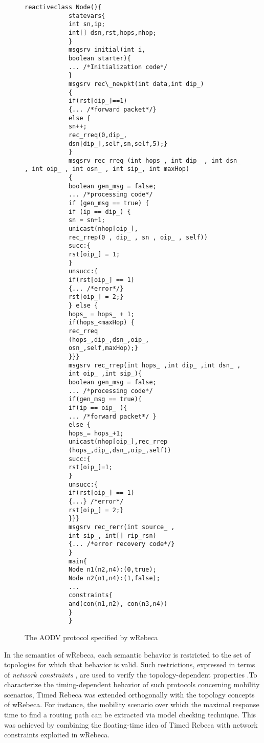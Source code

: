 \documentclass[conference]{IEEEtran}
\begin{document}
	\begin{figure*}
		\begin{center}
			\begin{lstlisting}[language=rebeca,multicols=2]
			reactiveclass Node(){
			statevars{
			int sn,ip;
			int[] dsn,rst,hops,nhop;
			}
			msgsrv initial(int i, 
			boolean starter){ 
			... /*Initialization code*/
			}			
			msgsrv rec\_newpkt(int data,int dip_)
			{
			if(rst[dip_]==1) 
			{... /*forward packet*/}
			else {                       
			sn++;
			rec_rreq(0,dip_,
			dsn[dip_],self,sn,self,5);}
			}   		
			msgsrv rec_rreq (int hops_, int dip_ , int dsn_ , int oip_ , int osn_ , int sip_, int maxHop) 
			{    
			boolean gen_msg = false;
			... /*processing code*/
			if (gen_msg == true) {
			if (ip == dip_) {
			sn = sn+1;
			unicast(nhop[oip_],
			rec_rrep(0 , dip_ , sn , oip_ , self))
			succ:{
			rst[oip_] = 1;
			}
			unsucc:{
			if(rst[oip_] == 1) 
			{... /*error*/}
			rst[oip_] = 2;}
			} else {
			hops_ = hops_ + 1;
			if(hops_<maxHop) {
			rec_rreq
			(hops_,dip_,dsn_,oip_,
			osn_,self,maxHop);} 
			}}}  		
			msgsrv rec_rrep(int hops_ ,int dip_ ,int dsn_ ,
			int oip_ ,int sip_){      
			boolean gen_msg = false;
			... /*processing code*/
			if(gen_msg == true){
			if(ip == oip_ ){
			... /*forward packet*/ }
			else {
			hops_= hops_+1;
			unicast(nhop[oip_],rec_rrep
			(hops_,dip_,dsn_,oip_,self))
			succ:{
			rst[oip_]=1;
			}
			unsucc:{
			if(rst[oip_] == 1) 
			{...} /*error*/
			rst[oip_] = 2;}
			}}}
			msgsrv rec_rerr(int source_ ,
			int sip_, int[] rip_rsn) 
			{... /*error recovery code*/}
			}
			main{
			Node n1(n2,n4):(0,true);
			Node n2(n1,n4):(1,false);
			...
			constraints{
			and(con(n1,n2), con(n3,n4)) 
			}  
			}
			\end{lstlisting}
		\end{center}
		\caption{The AODV protocol specified by wRebeca \label{code:aodv}\cite{AODVFatemeh}}
	\end{figure*} 
	
	
	In the semantics of wRebeca, each semantic behavior is restricted to the set of topologies for which that behavior is valid. Such restrictions, expressed in terms of \emph{network constraints} \cite{FatemehFI10,FatemehFI19}, are used to verify the topology-dependent properties \cite{FORM,CSI2018}.To characterize the timing-dependent behavior of such protocols concerning mobility scenarios, Timed Rebeca was extended orthogonally with the topology concepts of wRebeca. For instance, the mobility scenario over which the maximal response time to find a routing path can be extracted via model checking technique. This was achieved by combining the floating-time idea of Timed Rebeca with network constraints exploited in wRebeca. 
	
\end{document}
